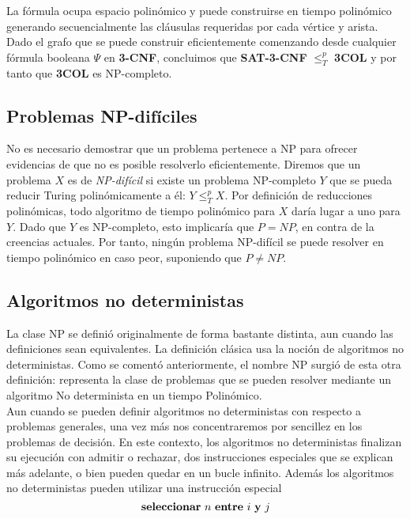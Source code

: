 La fórmula ocupa espacio polinómico y puede construirse en tiempo polinómico generando secuencialmente las cláusulas requeridas por cada vértice y arista. Dado el grafo que se puede construir eficientemente comenzando desde cualquier fórmula booleana $\Psi$ en \textbf{3-CNF}, concluimos que \textbf{SAT-3-CNF} $\leq _{T}^p$ \textbf{3COL} y por tanto que \textbf{3COL} es NP-completo.\\

\subsection{Problemas NP-difíciles}

No es necesario demostrar que un problema pertenece a NP para ofrecer evidencias de que no es posible resolverlo eficientemente. Diremos que un problema $X$ es de \emph{NP-difícil} si existe un problema NP-completo $Y$ que se pueda reducir Turing polinómicamente a él: $Y \leq _{T}^p X$. Por definición de reducciones polinómicas, todo algoritmo de tiempo polinómico para $X$ daría lugar a uno para $Y$. Dado que $Y$ es NP-completo, esto implicaría que $P = NP$, en contra de la creencias actuales. Por tanto, ningún problema NP-difícil se puede resolver en tiempo polinómico en caso peor, suponiendo que $P \neq NP$.\\

\subsection{Algoritmos no deterministas}

La clase NP se definió originalmente de forma bastante distinta, aun cuando las definiciones sean equivalentes. La definición clásica usa la noción de algoritmos no deterministas. Como se comentó anteriormente, el nombre NP surgió de esta otra definición: representa la clase de problemas que se pueden resolver mediante un algoritmo No determinista en un tiempo Polinómico.\\

Aun cuando se pueden definir algoritmos no deterministas con respecto a problemas generales, una vez más nos concentraremos por sencillez en los problemas de decisión. En este contexto, los algoritmos no deterministas finalizan su ejecución con admitir o rechazar, dos instrucciones especiales que se explican más adelante, o bien pueden quedar en un bucle infinito. Además los algoritmos no deterministas pueden utilizar una instrucción especial
\[ \mbox{\textbf{seleccionar}}\ n\ \mbox{\textbf{entre}}\ i\ \mbox{\textbf{y}}\ j \]

